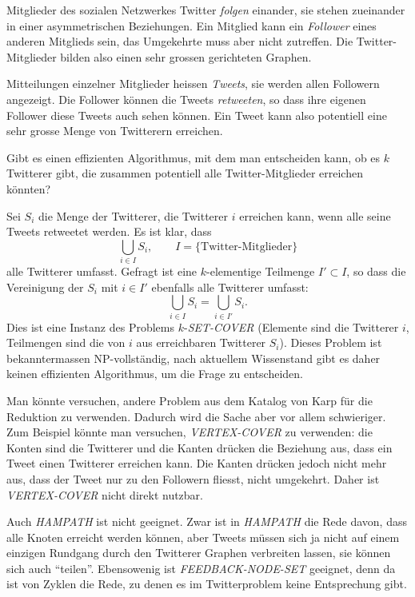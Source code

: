 Mitglieder des sozialen Netzwerkes Twitter {\it folgen} einander,
sie stehen zueinander in einer asymmetrischen Beziehungen. Ein Mitglied
kann ein {\it Follower} eines anderen Mitglieds sein, das Umgekehrte
muss aber nicht zutreffen. Die Twitter-Mitglieder bilden also
einen sehr grossen gerichteten Graphen.

Mitteilungen einzelner Mitglieder heissen {\it Tweets}, sie werden
allen Followern angezeigt. Die Follower können die Tweets {\it retweeten},
so dass ihre eigenen Follower diese Tweets auch sehen können.
Ein Tweet kann also potentiell eine sehr grosse Menge von Twitterern
erreichen.

Gibt es einen effizienten Algorithmus, mit dem man entscheiden kann,
ob es $k$ Twitterer gibt, die zusammen potentiell alle Twitter-Mitglieder
erreichen könnten?

\begin{loesung}
Sei $S_i$ die Menge der Twitterer, die Twitterer $i$ erreichen kann,
wenn alle seine Tweets retweetet werden. Es ist klar, dass
\[
\bigcup_{i\in I}S_i,\qquad I=\{\text{Twitter-Mitglieder}\}
\]
alle Twitterer umfasst. Gefragt ist eine $k$-elementige Teilmenge
$I'\subset I$, so dass die Vereinigung der $S_i$ mit $i\in I'$
ebenfalls alle Twitterer umfasst:
\[
\bigcup_{i\in I}S_i
=
\bigcup_{i\in I'}S_i.
\]
Dies ist eine Instanz des Problems $k$-{\it SET-COVER} (Elemente sind
die Twitterer $i$, Teilmengen sind die von $i$ aus erreichbaren
Twitterer $S_i$). Dieses Problem ist bekanntermassen NP-vollständig,
nach aktuellem Wissenstand gibt es daher keinen effizienten Algorithmus, um
die Frage zu entscheiden.

Man könnte versuchen, andere Problem aus dem Katalog von Karp für
die Reduktion zu verwenden. Dadurch wird die Sache aber vor allem
schwieriger. Zum Beispiel könnte man versuchen, {\it VERTEX-COVER} zu
verwenden: die Konten sind die Twitterer und die Kanten drücken
die Beziehung aus, dass ein Tweet einen Twitterer erreichen kann.
Die Kanten drücken jedoch nicht mehr aus, dass der Tweet nur zu
den Followern fliesst, nicht umgekehrt.
Daher ist {\it VERTEX-COVER} nicht direkt nutzbar.

Auch {\it HAMPATH} ist nicht geeignet.
Zwar ist in {\it HAMPATH} die Rede davon, dass alle Knoten erreicht
werden können, aber Tweets müssen sich ja nicht auf einem einzigen
Rundgang durch den Twitterer Graphen verbreiten lassen, sie können
sich auch ``teilen''. Ebensowenig ist {\it FEEDBACK-NODE-SET}
geeignet, denn da ist von Zyklen die Rede, zu denen es im Twitterproblem
keine Entsprechung gibt.
\end{loesung}
